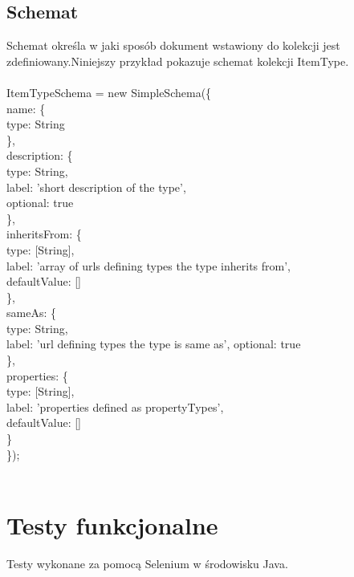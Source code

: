 \documentclass{article}
\begin{document}
\subsection{Schemat}
	Schemat określa w jaki sposób dokument wstawiony do kolekcji jest zdefiniowany.Niniejszy przykład pokazuje schemat kolekcji ItemType.\\\\
	ItemTypeSchema = new SimpleSchema(\{\\
		name: \{\\
			type: String\\
		\},\\
		description: \{\\
			type: String,\\
			label: 'short description of the type',\\
			optional: true\\
		\},\\
		inheritsFrom: \{\\
			type: [String],\\
			label: 'array of urls defining types the type inherits from',\\
			defaultValue: []\\
		\},\\
		sameAs: \{\\
			type: String,\\
			label: 'url defining types the type is same as',
			optional: true\\
		\},\\
		properties: \{\\
			type: [String],\\
			label: 'properties defined as propertyTypes',\\
			defaultValue: []\\
		\}\\
	\});\\\\	 
\section {Testy funkcjonalne}
	Testy wykonane za pomocą Selenium w środowisku Java.\\
	
\end{document}
